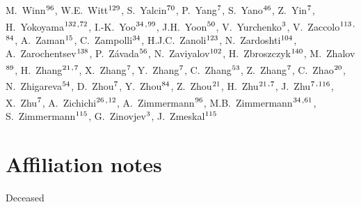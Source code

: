 \begin{flushleft}
M.~Winn$^\textrm{\scriptsize 96}$,
W.E.~Witt$^\textrm{\scriptsize 129}$,
S.~Yalcin$^\textrm{\scriptsize 70}$,
P.~Yang$^\textrm{\scriptsize 7}$,
S.~Yano$^\textrm{\scriptsize 46}$,
Z.~Yin$^\textrm{\scriptsize 7}$,
H.~Yokoyama$^\textrm{\scriptsize 132}$\textsuperscript{,}$^\textrm{\scriptsize 72}$,
I.-K.~Yoo$^\textrm{\scriptsize 34}$\textsuperscript{,}$^\textrm{\scriptsize 99}$,
J.H.~Yoon$^\textrm{\scriptsize 50}$,
V.~Yurchenko$^\textrm{\scriptsize 3}$,
V.~Zaccolo$^\textrm{\scriptsize 113}$\textsuperscript{,}$^\textrm{\scriptsize 84}$,
A.~Zaman$^\textrm{\scriptsize 15}$,
C.~Zampolli$^\textrm{\scriptsize 34}$,
H.J.C.~Zanoli$^\textrm{\scriptsize 123}$,
N.~Zardoshti$^\textrm{\scriptsize 104}$,
A.~Zarochentsev$^\textrm{\scriptsize 138}$,
P.~Z\'{a}vada$^\textrm{\scriptsize 56}$,
N.~Zaviyalov$^\textrm{\scriptsize 102}$,
H.~Zbroszczyk$^\textrm{\scriptsize 140}$,
M.~Zhalov$^\textrm{\scriptsize 89}$,
H.~Zhang$^\textrm{\scriptsize 21}$\textsuperscript{,}$^\textrm{\scriptsize 7}$,
X.~Zhang$^\textrm{\scriptsize 7}$,
Y.~Zhang$^\textrm{\scriptsize 7}$,
C.~Zhang$^\textrm{\scriptsize 53}$,
Z.~Zhang$^\textrm{\scriptsize 7}$,
C.~Zhao$^\textrm{\scriptsize 20}$,
N.~Zhigareva$^\textrm{\scriptsize 54}$,
D.~Zhou$^\textrm{\scriptsize 7}$,
Y.~Zhou$^\textrm{\scriptsize 84}$,
Z.~Zhou$^\textrm{\scriptsize 21}$,
H.~Zhu$^\textrm{\scriptsize 21}$\textsuperscript{,}$^\textrm{\scriptsize 7}$,
J.~Zhu$^\textrm{\scriptsize 7}$\textsuperscript{,}$^\textrm{\scriptsize 116}$,
X.~Zhu$^\textrm{\scriptsize 7}$,
A.~Zichichi$^\textrm{\scriptsize 26}$\textsuperscript{,}$^\textrm{\scriptsize 12}$,
A.~Zimmermann$^\textrm{\scriptsize 96}$,
M.B.~Zimmermann$^\textrm{\scriptsize 34}$\textsuperscript{,}$^\textrm{\scriptsize 61}$,
S.~Zimmermann$^\textrm{\scriptsize 115}$,
G.~Zinovjev$^\textrm{\scriptsize 3}$,
J.~Zmeskal$^\textrm{\scriptsize 115}$
\renewcommand\labelenumi{\textsuperscript{\theenumi}~}

\section*{Affiliation notes}
\renewcommand\theenumi{\roman{enumi}}
\begin{Authlist}
\item {}Deceased
\item {}
\item {}
\item {}
\end{Authlist}


\end{flushleft}
